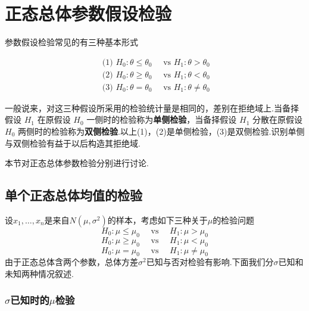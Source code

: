\section{正态总体参数假设检验\label{sec:7.2}}
参数假设检验常见的有三种基本形式

\[\begin{array} { l } { \text { (1) } H _ { 0 } : \theta \leq \theta _ { 0 } \quad \text { vs } H _ { 1 } : \theta > \theta _ { 0 } } \\ { \text { (2) } H _ { 0 } : \theta \geq \theta _ { 0 } \quad \text { vs } H _ { 1 } ; \theta < \theta _ { 0 } } \\ { \text { (3) } H _ { 0 } : \theta = \theta _ { 0 } \quad \text { vs } H _ { 1 } : \theta \neq \theta _ { 0 } } \end{array}\]

一般说来，对这三种假设所采用的检验统计量是相同的，差别在拒绝域上.当备择假设 $H_{1}$ 在原假设 $H_{0}$ 一侧时的检验称为\textbf{单侧检验}，当备择假设 $H_{1}$ 分散在原假设 $H_{0}$ 两侧时的检验称为\textbf{双侧检验}.以上(1)，(2)是单侧检验，(3)是双侧检验.识别单侧与双侧检验有益于以后构造其拒绝域.

本节对正态总体参数检验分别进行讨论.
\subsection{单个正态总体均值的检验\label{7.2.1}}
设$x _ { 1 } , \dotsc , x _ { n }$是来自$N(\mu ,\sigma^{2})$的样本，考虑如下三种关于$\mu $的检验问题
\begin{equation}\label{eq7.2.1}
H _ { 0 } : \mu \leq \mu _ { 0 } \quad \text { vs } \quad H _ { 1 } : \mu > \mu _ { 0 }
\end{equation}
\begin{equation}\label{eq7.2.2}
H _ { 0 } : \mu \geq \mu _ { 0 } \quad \text { vs } \quad H _ { 1 } : \mu < \mu _ { 0 }
\end{equation}
\begin{equation}\label{eq7.2.3}
H _ { 0 } : \mu = \mu _ { 0 } \quad \text { vs } \quad H _ { 1 } : \mu \neq \mu _ { 0 }
\end{equation}
由于正态总体含两个参数，总体方差$\sigma^{2}$已知与否对检验有影响.下面我们分$\sigma$已知和未知两种情况叙述.

\subsubsection{$\sigma$已知时的$\mu$检验}


